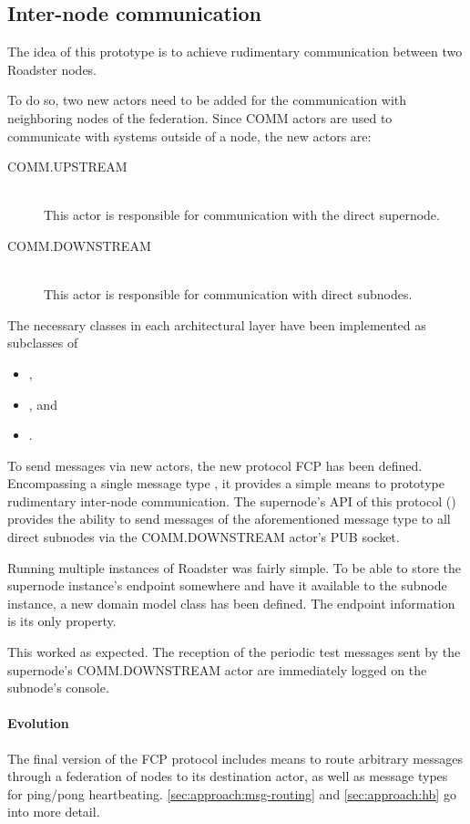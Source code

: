 \subsection{Inter-node communication}
The idea of this prototype is to achieve rudimentary communication between two
Roadster nodes.

To do so, two new actors need to be added for the communication with neighboring nodes of the
federation.  Since COMM actors are used to communicate with systems outside of
a node, the new actors are:
\begin{description}
\item [COMM.UPSTREAM]\hfill\\
This actor is responsible for communication with the direct supernode.
\item [COMM.DOWNSTREAM]\hfill\\
This actor is responsible for communication with direct subnodes.
\end{description}

The necessary classes in each architectural layer have been implemented as
subclasses of
\begin{itemize}
\item {},
\item {}, and
\item {}.
\end{itemize}

To send messages via new actors, the new protocol \gls{FCP} has been defined.
Encompassing a single message type , it provides a
simple means to prototype rudimentary inter-node communication. The supernode's
API of this protocol () provides
the ability to send messages of the aforementioned message type to all direct
subnodes via the COMM.DOWNSTREAM actor's PUB \zmq socket.

Running multiple instances of Roadster was fairly simple.
To be able to store the supernode instance's \zmq endpoint somewhere and have
it available to the subnode instance, a new domain model class
 has been defined. The endpoint information
is its only property.

This worked as expected. The reception of the periodic test messages sent by
the supernode's COMM.DOWNSTREAM actor are immediately logged on the subnode's
console.

\paragraph{Evolution} The final version of the FCP protocol includes means to route arbitrary
messages through a federation of nodes to its destination actor, as well as
message types for ping/pong heartbeating. \autoref{sec:approach:msg-routing}
and \autoref{sec:approach:hb} go into more detail.

